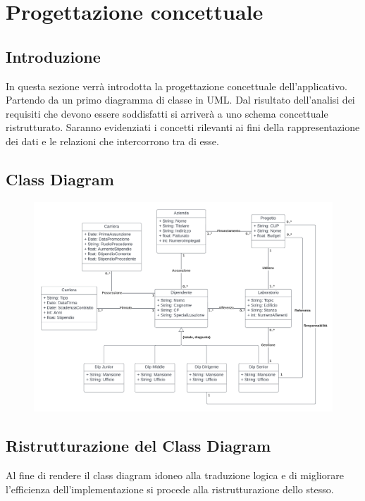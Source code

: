 \chapter{Progettazione concettuale}
\section{Introduzione}
In questa sezione verrà introdotta la progettazione concettuale dell'applicativo. Partendo da un primo diagramma di classe in UML. Dal risultato dell'analisi dei requisiti che devono essere soddisfatti si arriverà a uno schema concettuale ristrutturato. Saranno evidenziati i concetti rilevanti ai fini della rappresentazione dei dati e le relazioni che intercorrono tra di esse.

\section{Class Diagram}
\begin{figure}[!h]
    \includegraphics[width=.8\linewidth]{./Immagini/BozzaProgetto.png}
\end{figure}

\section{Ristrutturazione del Class Diagram}
Al fine di rendere il class diagram idoneo alla traduzione logica e di migliorare l’efficienza dell’implementazione si procede alla ristrutturazione dello stesso.

